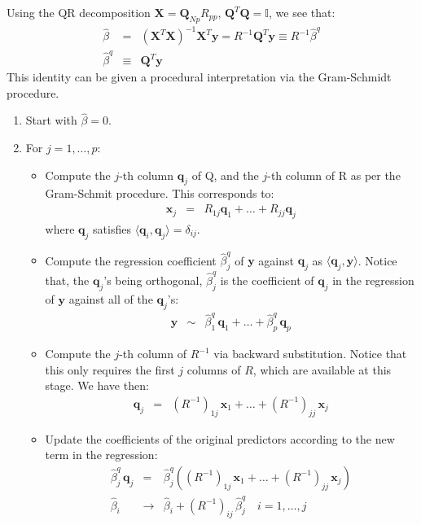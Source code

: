

Using the QR decomposition $\mathbf{X} = \mathbf{Q}_{Np} R_{pp}$, $\mathbf{Q}^T \mathbf{Q} = \mathbb{I}$, we see that:
\begin{eqnarray*}
    \hat{\beta} & = & \left( \mathbf{X} ^T \mathbf{X} \right)^{-1} \mathbf{X}^T \mathbf{y} = R^{-1} \mathbf{Q}^T \mathbf{y} \equiv R^{-1} \hat{\beta}^q\\
    \hat{\beta}^q & \equiv & \mathbf{Q}^T \mathbf{y}
\end{eqnarray*}
This identity can be given a procedural interpretation via the Gram-Schmidt procedure.

\begin{enumerate}
    \item Start with $\hat{\beta} = 0$.
    \item For $j = 1, \ldots, p$:
    \begin{itemize}
        \item Compute the $j$-th column $\mathbf{q}_j$ of Q, and the $j$-th column of R as per
        the Gram-Schmit procedure. This corresponds to:
        \begin{eqnarray*}
            \mathbf{x}_j & = & R_{1j} \mathbf{q}_1 + \ldots + R_{jj} \mathbf{q}_j
        \end{eqnarray*}
        where $\mathbf{q}_j$ satisfies $\langle \mathbf{q}_i, \mathbf{q}_j \rangle = \delta_{ij}$.
        \item Compute the regression coefficient $\hat{\beta}_j^q$ of $\mathbf{y}$ against $\mathbf{q}_j$
        as $\langle \mathbf{q}_j, \mathbf{y} \rangle$. Notice that, the $\mathbf{q}_j$'s being orthogonal,
        $\hat{\beta}_j^q$ is the coefficient of $\mathbf{q}_j$ in the regression of $\mathbf{y}$ against
        all of the $\mathbf{q}_j$'s:
        \begin{eqnarray*}
            \mathbf{y} & \sim & \hat{\beta}^q_1\, \mathbf{q}_1 + \ldots + \hat{\beta}^q_p\, \mathbf{q}_p
        \end{eqnarray*}
        \item Compute the $j$-th column of $R^{-1}$ via backward substitution. Notice that this only 
        requires the first $j$ columns of $R$, which are available at this stage. We have then:
        \begin{eqnarray}
        \label{3p4_e1}
        \mathbf{q}_j & = & (R^{-1})_{1j}\,\mathbf{x}_1 + \ldots + (R^{-1})_{jj}\, \mathbf{x}_j
        \end{eqnarray}
        \item Update the coefficients of the original predictors according to the new term in the regression:
        \begin{eqnarray*}
            \hat{\beta}^q_j\, \mathbf{q}_j & = & \hat{\beta}^q_j \left( (R^{-1})_{1j}\,\mathbf{x}_1 + \ldots + (R^{-1})_{jj}\, \mathbf{x}_j \right)\\
            \hat{\beta}_i &\rightarrow& \hat{\beta}_i + (R^{-1})_{ij}\,\hat{\beta}^q_j \quad i = 1,\ldots,j
        \end{eqnarray*}
    \end{itemize}
\end{enumerate}